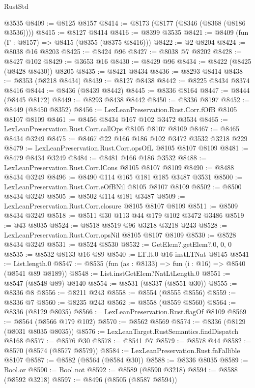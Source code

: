 \begin{lexlean}{RustStd}
\begin{coremodule}
    @3535
@8409 := @8125 @8157
@8414 := @8173 (@8177 (@8346 (@8368 (@8186 @3536))))
@8415 := @8127 @8414
@8416 := @8399 @3535
@8421 := @8409 (fun (Γ : @8157) => @8415 (@8355 (@8375 @8416)))
@8422 := @2 @8204
@8424 := @8038 @16 @8203
@8425 := @8424 @96
@8427 := @8038 @7 @8202
@8428 := @8427 @102
@8429 := @3653 @16
@8430 := @8429 @96
@8434 := @8422 (@8425 (@8428 @8430)) @8205
@8435 := @8421 @8434
@8436 := @8293 @8414
@8438 := @8353 (@8218 @8434)
@8439 := @8127 @8438
@8442 := @8225 @8434 @8374 @8416
@8444 := @8436 (@8439 @8442)
@8445 := @8336 @8164
@8447 := @8444 (@8445 @8172)
@8449 := @8293 @8438 @8442
@8450 := @8336 @8197
@8452 := @8449 (@8450 @8352)
@8456 := LexLeanPreservation.Rust.Corr.fOfB @8105 @8107 @8109
@8461 := @8456 @8434 @167 @102 @3472 @3534
@8465 := LexLeanPreservation.Rust.Corr.callOps @8105 @8107 @8109
@8467 := @8465 @8434 @3249
@8475 := @8467 @22 @166 @186 @102 @3472 @3532 @3218 @229
@8479 := LexLeanPreservation.Rust.Corr.opsOfL @8105 @8107 @8109
@8481 := @8479 @8434 @3249
@8484 := @8481 @166 @186 @3532
@8488 := LexLeanPreservation.Rust.Corr.lCons @8105 @8107 @8109
@8490 := @8488 @8434 @3249
@8496 := @8490 @114 @165 @181 @185 @3487 @3531
@8500 := LexLeanPreservation.Rust.Corr.eOfBNil @8105 @8107 @8109
@8502 := @8500 @8434 @3249
@8505 := @8502 @114 @181 @3487
@8509 := LexLeanPreservation.Rust.Corr.closure @8105 @8107 @8109
@8511 := @8509 @8434 @3249
@8518 := @8511 @30 @113 @44 @179 @102 @3472 @3486
@8519 := @43 @8035
@8524 := @8518 @8519 @96 @3218 @3218 @243
@8528 := LexLeanPreservation.Rust.Corr.opsNil @8105 @8107 @8109
@8530 := @8528 @8434 @3249
@8531 := @8524 @8530
@8532 := GetElem?.getElem?.{0, 0, 0}
@8535 := @8532 @8133 @16 @89
@8540 := LT.lt.{0} @16 instLTNat @8145
@8541 := List.length.{0}
@8547 := @8535 (fun (as : @8133) => fun (i : @16) => @8540 (@8541 @89 @8189))
@8548 := List.instGetElem?NatLtLength.{0}
@8551 := @8547 (@8548 @89) @8140
@8554 := @8531 (@8337 (@8551 @30))
@8555 := @8336 @8
@8556 := @8211 @243
@8558 := @8554 (@8555 @8556)
@8559 := @8336 @7
@8560 := @8235 @243
@8562 := @8558 (@8559 @8560)
@8564 := @8336 (@8129 @8035)
@8566 := LexLeanPreservation.Rust.flagOf @8109
@8569 := @8564 (@8566 @179 @102)
@8570 := @8562 @8569
@8574 := @8336 (@8129 (@8031 @8035 @8035))
@8576 := LexLeanTarget.RustSemantics.findDispatch @8168
@8577 := @8576 @30
@8578 := @8541 @7
@8579 := @8578 @44
@8582 := @8570 (@8574 (@8577 @8579))
@8584 := LexLeanPreservation.Rust.fnFallible @8107
@8587 := @8582 (@8564 (@8584 @30))
@8588 := @8336 @8035
@8589 := Bool.or
@8590 := Bool.not
@8592 := @8589 (@8590 @3218)
@8594 := @8588 (@8592 @3218)
@8597 := @8496 (@8505 (@8587 @8594))

\end{coremodule}
\end{lexlean}
